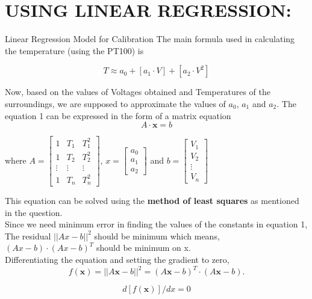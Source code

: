 \documentclass{article}
\begin{document}
\newpage
\section{USING LINEAR REGRESSION:}
Linear Regression Model for Calibration
The main formula used in calculating the temperature (using the PT100) is

\begin{equation}
    T \approx a_0 + [a_1 \cdot V] + [a_2 \cdot V^2]
\end{equation}
        
Now, based on the values of Voltages obtained and Temperatures of the surroundings, we are supposed to approximate the values of $a_0$, $a_1$ and $a_2$.
The equation {1} can be expressed in the form of a matrix equation
\begin{equation}
    A \cdot \textbf{x} = b
\end{equation}
 		
where $A =\begin{bmatrix}1 & T_1 & T_1^2 \\1 & T_2 & T_2^2 \\\vdots & \vdots & \vdots \\1 & T_n & T_n^2\end{bmatrix}$, $x = \begin{bmatrix}a_0\\a_1\\a_2\end{bmatrix}$ and $b = \begin{bmatrix}V_1 \\V_2 \\\vdots \\V_n\end{bmatrix}$

This equation can be solved using the \textbf{method of least squares} as mentioned in the question.\\
Since we need minimum error in finding the values of the constants in equation {1},
The residual $||Ax - b||^2$ should be minimum which means, $(Ax - b)\cdot(Ax - b)^T$ should be minimum on x.\\
Differentiating the equation and setting the gradient to zero,
\begin{equation}
    f(\textbf{x}) = ||A\textbf{x} - b||^2 = (A\textbf{x} - b)^T \cdot (A\textbf{x} - b).
\end{equation}

\begin{equation}
    d[f(\textbf{x})] / dx = 0
\end{equation}
\end{document}
